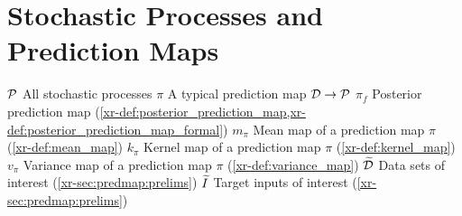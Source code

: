 \documentclass[12pt]{report}
\newcommand{\xrprefix}[1]{xr-#1}
\begin{document}
\section*{Stochastic Processes and Prediction Maps}
\entry
    {$\mathcal{P}$}
    {All stochastic processes}
\entry
    {$\pi$}
    {A typical prediction map $ \mathcal{D} \to \mathcal{P}$}
\entry
    {$\pi_f$}
    {Posterior prediction map (\cref{\xrprefix{def:posterior_prediction_map},\xrprefix{def:posterior_prediction_map_formal}})}
\entry
    {$m_\pi$}
    {Mean map of a prediction map $\pi$ (\cref{\xrprefix{def:mean_map}})}
\entry
    {$k_\pi$}
    {Kernel map of a prediction map $\pi$ (\cref{\xrprefix{def:kernel_map}})}
\entry
    {$v_\pi$}
    {Variance map of a prediction map $\pi$ (\cref{\xrprefix{def:variance_map}})}
\entry
    {$\widetilde{\mathcal{D}}$}
    {Data sets of interest (\cref{\xrprefix{sec:predmap:prelims}})}
\entry
    {$\widetilde{I}$}
    {Target inputs of interest (\cref{\xrprefix{sec:predmap:prelims}})}
\end{document}
